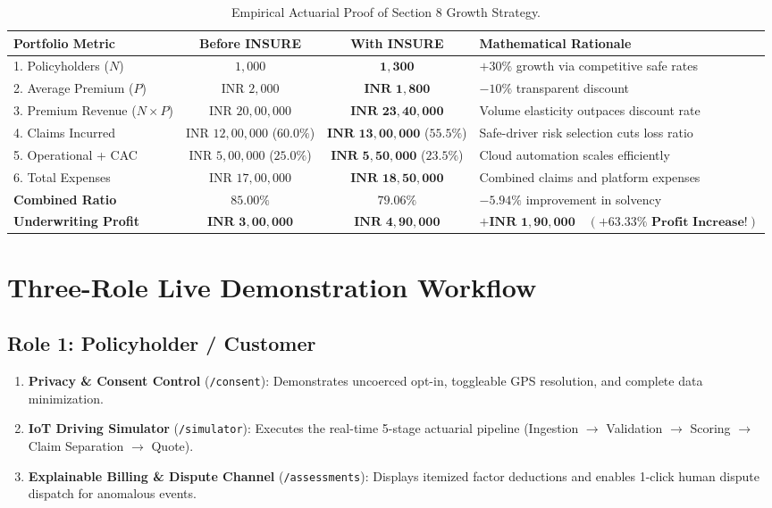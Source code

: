 \documentclass[11pt,a4paper]{article}
\begin{document}
\begin{table}[h!]
\centering
\small
\begin{tabular}{l c c l}
\toprule
\textbf{Portfolio Metric} & \textbf{Before INSURE} & \textbf{With INSURE} & \textbf{Mathematical Rationale} \\
\midrule
1. Policyholders ($N$) & $1,000$ & $\mathbf{1,300}$ & $+30\%$ growth via competitive safe rates \\
2. Average Premium ($P$) & INR $2,000$ & $\mathbf{\text{INR } 1,800}$ & $-10\%$ transparent discount \\
3. Premium Revenue ($N \times P$) & INR $20,00,000$ & $\mathbf{\text{INR } 23,40,000}$ & Volume elasticity outpaces discount rate \\
4. Claims Incurred & INR $12,00,000$ ($60.0\%$) & $\mathbf{\text{INR } 13,00,000}$ ($55.5\%$) & Safe-driver risk selection cuts loss ratio \\
5. Operational + CAC & INR $5,00,000$ ($25.0\%$) & $\mathbf{\text{INR } 5,50,000}$ ($23.5\%$) & Cloud automation scales efficiently \\
6. Total Expenses & INR $17,00,000$ & $\mathbf{\text{INR } 18,50,000}$ & Combined claims and platform expenses \\
\midrule
\textbf{Combined Ratio} & $\mathbf{85.00\%}$ & $\mathbf{79.06\%}$ & $-5.94\%$ improvement in solvency \\
\textbf{Underwriting Profit} & $\mathbf{\text{INR } 3,00,000}$ & $\mathbf{\text{INR } 4,90,000}$ & $\mathbf{+\text{INR } 1,90,000 \quad (+63.33\% \text{ Profit Increase!})}$ \\
\bottomrule
\end{tabular}
\caption{Empirical Actuarial Proof of Section 8 Growth Strategy.}
\end{table}

\section{Three-Role Live Demonstration Workflow}

\subsection{Role 1: Policyholder / Customer}
\begin{enumerate}[noitemsep]
    \item \textbf{Privacy \& Consent Control} (\texttt{/consent}): Demonstrates uncoerced opt-in, toggleable GPS resolution, and complete data minimization.
    \item \textbf{IoT Driving Simulator} (\texttt{/simulator}): Executes the real-time 5-stage actuarial pipeline (Ingestion $\to$ Validation $\to$ Scoring $\to$ Claim Separation $\to$ Quote).
    \item \textbf{Explainable Billing \& Dispute Channel} (\texttt{/assessments}): Displays itemized factor deductions and enables 1-click human dispute dispatch for anomalous events.
\end{enumerate}
\end{document}
